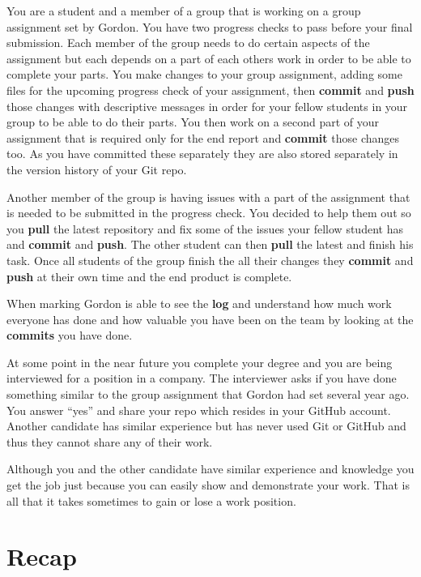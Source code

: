 \documentclass[
]{book}
\begin{document}
You are a student and a member of a group that is working on a group assignment set by Gordon. You have two progress checks to pass before your final submission.
Each member of the group needs to do certain aspects of the assignment but each depends on a part of each others work in order to be able to complete your parts.
You make changes to your group assignment, adding some files for the upcoming progress check of your assignment, then \textbf{commit} and \textbf{push} those changes with descriptive messages in order for your fellow students in your group to be able to do their parts. You then work on a second part of your assignment that is required only for the end report and \textbf{commit} those changes too. As you have committed these separately they are also stored separately in the version history of your Git repo.

Another member of the group is having issues with a part of the assignment that is needed to be submitted in the progress check. You decided to help them out so you \textbf{pull} the latest repository and fix some of the issues your fellow student has and \textbf{commit} and \textbf{push}. The other student can then \textbf{pull} the latest and finish his task. Once all students of the group finish the
all their changes they \textbf{commit} and \textbf{push} at their own time and the end product is complete.

When marking Gordon is able to see the \textbf{log} and understand how much work everyone has done and how valuable you have been on the team by looking at the \textbf{commits} you have done.

At some point in the near future you complete your degree and you are being interviewed for a position in a company.
The interviewer asks if you have done something similar to the group assignment that Gordon had set several year ago. You answer ``yes'' and share your repo which resides in your GitHub account.
Another candidate has similar experience but has never used Git or GitHub and thus they cannot share any of their work.

Although you and the other candidate have similar experience and knowledge you get the job just because you can easily show and demonstrate your work. That is all that it takes sometimes to gain or lose a work position.

\hypertarget{recap}{%
\chapter{Recap}\label{recap}}
\end{document}
